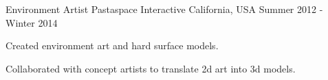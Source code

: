 \begin{cventries}
  \cventry
	{Environment Artist} %
    {Pastaspace Interactive} %
    {California, USA} %
    {Summer 2012 - Winter 2014} %
    {
      \begin{cvitems} %
        \item {Created environment art and hard surface models.}
		\item {Collaborated with concept artists to translate 2d art into 3d models.}
      \end{cvitems}
    }
\end{cventries}

